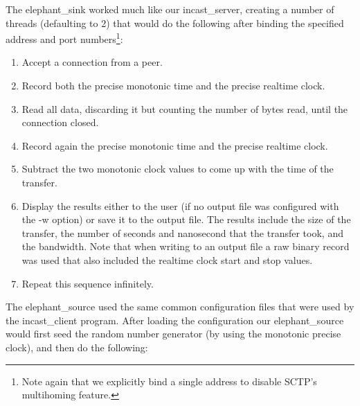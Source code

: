 \documentclass[12pt]{article}
\begin{document}
The elephant\_sink worked much like our incast\_server, creating a number of threads (defaulting to 2) that
would do the following after binding the specified address and port numbers\footnote{Note again that we explicitly bind a
single address to disable SCTP's multihoming feature.}:
\begin{enumerate}

\item Accept a connection from a peer.

\item Record both the precise monotonic time and the precise realtime clock.

\item Read all data, discarding it but counting the number of bytes read, until the connection closed.

\item Record again the precise monotonic time and the precise realtime clock.

\item Subtract the two monotonic clock values to come up with the time of the transfer.

\newpage

\item Display the results either to the user (if no output file was configured with the -w option) or save
it to the output file. The results include the size of the transfer, the number of seconds and nanosecond
that the transfer took, and the bandwidth. Note that when writing to an output file a raw binary record
was used that also included the realtime clock start and stop values.

\item Repeat this sequence infinitely.

\end{enumerate}

The elephant\_source used the same common configuration files that were used by the incast\_client program.
After loading the configuration our elephant\_source would first
seed the random number generator (by using the monotonic precise clock), and then
do the following:
\end{document}
